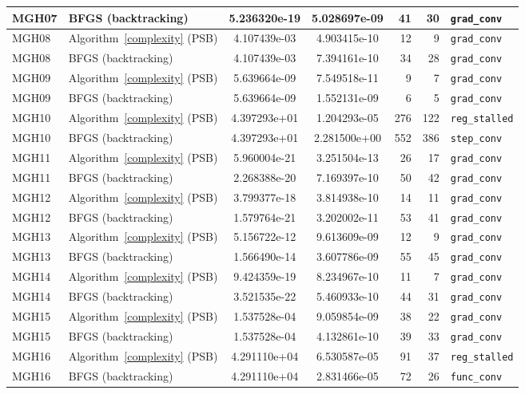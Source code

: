 \documentclass[11pt]{article}
\begin{document}
{\begin{longtable}{l l S[table-format=1.3e2] S[table-format=1.3e2] r r >{\raggedright\arraybackslash}p{2.2cm}}
MGH07 & BFGS (backtracking) & 5.236320e-19 & 5.028697e-09 & 41 & 30 & \texttt{grad\_conv} \\
\midrule
MGH08 & Algorithm~\ref{complexity} (PSB) & 4.107439e-03 & 4.903415e-10 & 12 & 9 & \texttt{grad\_conv} \\
MGH08 & BFGS (backtracking) & 4.107439e-03 & 7.394161e-10 & 34 & 28 & \texttt{grad\_conv} \\
\midrule
MGH09 & Algorithm~\ref{complexity} (PSB) & 5.639664e-09 & 7.549518e-11 & 9 & 7 & \texttt{grad\_conv} \\
MGH09 & BFGS (backtracking) & 5.639664e-09 & 1.552131e-09 & 6 & 5 & \texttt{grad\_conv} \\
\midrule
MGH10 & Algorithm~\ref{complexity} (PSB) & 4.397293e+01 & 1.204293e-05 & 276 & 122 & \texttt{reg\_stalled} \\
MGH10 & BFGS (backtracking) & 4.397293e+01 & 2.281500e+00 & 552 & 386 & \texttt{step\_conv} \\
\midrule
MGH11 & Algorithm~\ref{complexity} (PSB) & 5.960004e-21 & 3.251504e-13 & 26 & 17 & \texttt{grad\_conv} \\
MGH11 & BFGS (backtracking) & 2.268388e-20 & 7.169397e-10 & 50 & 42 & \texttt{grad\_conv} \\
\midrule
MGH12 & Algorithm~\ref{complexity} (PSB) & 3.799377e-18 & 3.814938e-10 & 14 & 11 & \texttt{grad\_conv} \\
MGH12 & BFGS (backtracking) & 1.579764e-21 & 3.202002e-11 & 53 & 41 & \texttt{grad\_conv} \\
\midrule
MGH13 & Algorithm~\ref{complexity} (PSB) & 5.156722e-12 & 9.613609e-09 & 12 & 9 & \texttt{grad\_conv} \\
MGH13 & BFGS (backtracking) & 1.566490e-14 & 3.607786e-09 & 55 & 45 & \texttt{grad\_conv} \\
\midrule
MGH14 & Algorithm~\ref{complexity} (PSB) & 9.424359e-19 & 8.234967e-10 & 11 & 7 & \texttt{grad\_conv} \\
MGH14 & BFGS (backtracking) & 3.521535e-22 & 5.460933e-10 & 44 & 31 & \texttt{grad\_conv} \\
\midrule
MGH15 & Algorithm~\ref{complexity} (PSB) & 1.537528e-04 & 9.059854e-09 & 38 & 22 & \texttt{grad\_conv} \\
MGH15 & BFGS (backtracking) & 1.537528e-04 & 4.132861e-10 & 39 & 33 & \texttt{grad\_conv} \\
\midrule
MGH16 & Algorithm~\ref{complexity} (PSB) & 4.291110e+04 & 6.530587e-05 & 91 & 37 & \texttt{reg\_stalled} \\
MGH16 & BFGS (backtracking) & 4.291110e+04 & 2.831466e-05 & 72 & 26 & \texttt{func\_conv} \\

\end{longtable}}
\end{document}
